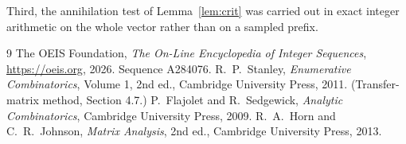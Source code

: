 \documentclass[11pt,a4paper]{article}
\theoremstyle{plain}
\theoremstyle{definition}
\begin{document}
Third, the annihilation test of Lemma~\ref{lem:crit} was carried out in exact integer
arithmetic on the whole vector rather than on a sampled prefix.

\begin{thebibliography}{9}
 The OEIS Foundation, \emph{The On-Line Encyclopedia of Integer
Sequences}, \url{https://oeis.org}, 2026. Sequence A284076.
 R.~P.~Stanley, \emph{Enumerative Combinatorics}, Volume 1, 2nd ed.,
Cambridge University Press, 2011. (Transfer-matrix method, Section 4.7.)
 P.~Flajolet and R.~Sedgewick, \emph{Analytic Combinatorics}, Cambridge
University Press, 2009.
 R.~A.~Horn and C.~R.~Johnson, \emph{Matrix Analysis}, 2nd ed., Cambridge
University Press, 2013.
\end{thebibliography}
\end{document}
